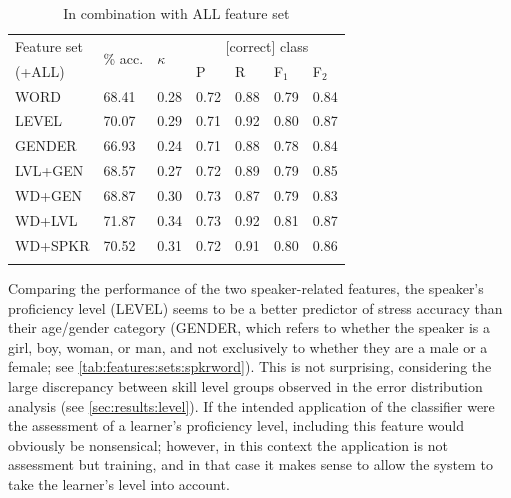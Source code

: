 \begin{table}[tb]
			\begin{subtable}{\textwidth}
			\centering
			\caption{In combination with ALL feature set}
			\begin{tabularx}{.8\textwidth}{lXXXXXX}			
			\toprule
			Feature set & \multirow{2}{*}{\% acc.} & \multirow{2}{*}{$\kappa$} & \multicolumn{4}{c}{[correct] class} \\
			 \cmidrule(lr){4-7}
			(+ALL)& & & P & R & F$_1$ & F$_2$ \\
			\midrule
WORD	&	68.41	&	0.28	&	0.72	&	0.88	&	0.79	&	0.84	\\
LEVEL	&	70.07	&	0.29	&	0.71	&	0.92	&	0.80	&	0.87	\\
GENDER	&	66.93	&	0.24	&	0.71	&	0.88	&	0.78	&	0.84	\\
\addlinespace													
LVL+GEN	&	68.57	&	0.27	&	0.72	&	0.89	&	0.79	&	0.85	\\
WD+GEN	&	68.87	&	0.30	&	0.73	&	0.87	&	0.79	&	0.83	\\
WD+LVL	&	71.87	&	0.34	&	0.73	&	0.92	&	0.81	&	0.87	\\		\addlinespace								
WD+SPKR	&	70.52	&	0.31	&	0.72	&	0.91	&	0.80	&	0.86	\\
			\bottomrule
			\label{tab:results:spkrword:all}
			\end{tabularx}
		\end{subtable}
		
		\label{tab:results:spkrword}
	\end{table}
	
	Comparing the performance of the two speaker-related features, the speaker's proficiency level (LEVEL) seems to be a better predictor of stress accuracy than their age/gender category (GENDER, which refers to whether the speaker is a girl, boy, woman, or man, and not exclusively to whether they are a male or a female; see \cref{tab:features:sets:spkrword}). This is not surprising, considering the large discrepancy between skill level groups observed in the error distribution analysis (see \cref{sec:results:level}). If the intended application of the classifier were the assessment of a learner's proficiency level, including this feature would obviously be nonsensical; however, in this context the application is not assessment but training, and in that case it makes sense to allow the system to take the learner's level into account. 
		
